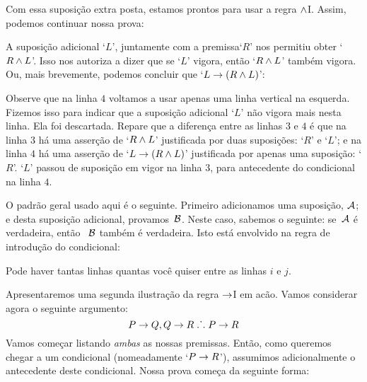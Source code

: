 Com essa  suposição extra posta, estamos prontos para usar a regra  $\wedge$I.  Assim, podemos continuar nossa prova: 
	\begin{fitchproof}
		\open
	\end{fitchproof}
A suposição adicional `$L$’, juntamente com a premissa`$R$' nos permitiu obter `$R \wedge L$'.  Isso nos autoriza a dizer que se `$L$’ vigora, então `$R \wedge L$' também vigora. Ou, mais brevemente, podemos concluir que  `$L \rightarrow (R \wedge L)$':	

\begin{fitchproof}
		\hypo{r}{R}
		\open
			\hypo{l}{L}
			\ai{r, l}
			\close
		\ci{l-rl}
	\end{fitchproof}


Observe que na linha $4$ voltamos a usar apenas uma linha vertical na esquerda. Fizemos isso para indicar que a suposição adicional `$L$' não vigora mais nesta linha. Ela foi descartada. Repare que a diferença entre as linhas $3$ e $4$ é que na linha $3$ há uma asserção  de `$R \wedge L$' justificada por duas suposições:  `$R$' e `$L$'; e na linha $4$ há uma asserção de  `$L \rightarrow (R \wedge L)$' justificada por apenas uma suposição:  `$R$'. `$L$' passou de suposição em vigor na linha $3$, para antecedente do condicional na linha $4$.

 O padrão geral usado aqui é o seguinte. Primeiro adicionamos uma suposição, $\mathcal{A}$;  e desta suposição  adicional, provamos~$\mathcal{B}$. Neste caso, sabemos o seguinte: se~$\mathcal{A}$ é verdadeira, então ~$\mathcal{B}$ também é verdadeira.  Isto está envolvido na regra de introdução do condicional:


\factoidbox{
	\begin{fitchproof}
		\open
			\hypo[i]{a}{\meta{A}} 
			\have[j]{b}{\meta{B}}
		\close
		\have[\ ]{ab}{\meta{A}\eif\meta{B}}\ci{a-b}
	\end{fitchproof}}
Pode haver tantas linhas quantas você quiser entre as linhas $i$ e $j$.  

Apresentaremos uma segunda ilustração da regra $\rightarrow$I em acão. Vamos considerar  agora o seguinte argumento:
	$$P \rightarrow Q, Q \rightarrow R \mathrel{\ldotp\dot{}\,\ldotp} P \rightarrow R$$
Vamos começar listando \emph{ambas} as nossas premissas. Então, como queremos chegar a um condicional (nomeadamente `$P \rightarrow R$'),  assumimos adicionalmente o antecedente deste condicional.
Nossa prova começa da seguinte forma:

